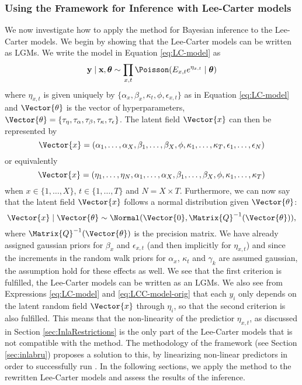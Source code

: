 \subsubsection{Using the \inla Framework for Inference with Lee-Carter models}
\newpar We now investigate how to apply the \inla method for Bayesian inference to the Lee-Carter models. We begin by showing that the Lee-Carter models can be written as LGMs. We write the model in Equation \ref{eq:LC-model} as 
\begin{equation}
    \textbf{y}\mid \textbf{x}, \boldsymbol{\theta} \sim \prod_{x,t}\Poisson(E_{x,t}e^{\eta_{x,t}}\mid \boldsymbol{\theta})
\end{equation}
where $\eta_{x,t}$ is given uniquely by $\{\alpha_x, \beta_x, \kappa_t, \phi, \epsilon_{x,t}\}$ as in Equation \ref{eq:LC-model} and $\Vector{\theta}$ is the vector of hyperparameters, $\Vector{\theta} = \{\tau_{\eta}, \tau_{\alpha}, \tau_{\beta}, \tau_{\kappa}, \tau_\epsilon\}$. The latent field $\Vector{x}$ can then be represented by 
\begin{equation*}
    \Vector{x} = (\alpha_1,\ldots,\alpha_X,\beta_1,\ldots,\beta_X, \phi, \kappa_1,\ldots, \kappa_T, \epsilon_1, \ldots, \epsilon_N)
\end{equation*}
or equivalently 
\begin{equation}
    \Vector{x} = (\eta_1,\ldots,\eta_N,\alpha_1,\ldots,\alpha_X,\beta_1,\ldots,\beta_X, \phi, \kappa_1,\ldots, \kappa_T)
    \label{eq:LChyperparams}
\end{equation}
when $x\in \{1,\ldots,X\}$, $t\in\{1,\ldots,T\}$ and $N=X\times T$. Furthermore, we can now say that the latent field $\Vector{x}$ follows a normal distribution given $\Vector{\theta}$:
\begin{equation}
        \Vector{x}\mid \Vector{\theta} \sim \Normal(\Vector{0}, \Matrix{Q}^{-1}(\Vector{\theta})),
        \label{eq:XNormalDist}
\end{equation}
where $\Matrix{Q}^{-1}(\Vector{\theta})$ is the precision matrix. We have already assigned gaussian priors for $\beta_x$ and $\epsilon_{x,t}$ (and then implicitly for $\eta_{x,t}$) and since the increments in the random walk priors for $\alpha_x$, $\kappa_t$ and $\gamma_k$ are assumed gaussian, the assumption hold for these effects as well. 
\newline
We see that the first criterion is fulfilled, the Lee-Carter models can be written as an LGMs. We also see from Expressions \ref{eq:LC-model} and \ref{eq:LCC-model-orig} that each $y_i$ only depends on the latent random field $\Vector{x}$ through $\eta_i$, so that the second criterion is also fulfilled. This means that the non-linearity of the predictior $\eta_{x,t}$, as discussed in Section \ref{sec:InlaRestrictions} is the only part of the Lee-Carter models that is not compatible with the \inla method. The methodology of the \inlabru framework (see Section \ref{sec:inlabru}) proposes a solution to this, by linearizing non-linear predictors in order to successfully run \inla. In the following sections, we apply the \inlabru method to the rewritten Lee-Carter models and assess the results of the inference. 